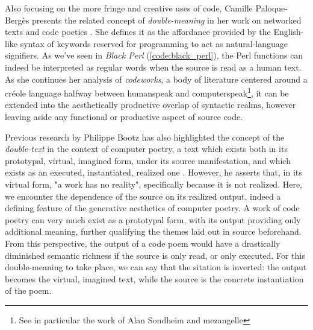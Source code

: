 Also focusing on the more fringe and creative uses of code, Camille Paloque-Bergès presents the related concept of \emph{double-meaning} in her work on networked texts and code poetics \citep{paloque-berges_poetique_2009}. She defines it as the affordance provided by the English-like syntax of keywords reserved for programming to act as natural-language signifiers. As we've seen in \emph{Black Perl} (\autoref{code:black_perl}), the Perl functions can indeed be interpreted as regular words when the source is read as a human text. As she continues her analysis of \emph{codeworks}, a body of literature centered around a créole language halfway between humanspeak and computerspeak\footnote{See in particular the work of Alan Sondheim and mezangelle}, it can be extended into the aesthetically productive overlap of syntactic realms, however leaving aside any functional or productive aspect of source code.

Previous research by Philippe Bootz has also highlighted the concept of the \emph{double-text} in the context of computer poetry, a text which exists both in its prototypal, virtual, imagined form, under its source manifestation, and which exists as an executed, instantiated, realized one \citep{bootz_problem_2005}. However, he asserts that, in its virtual form, "a work has no reality", specifically because it is not realized. Here, we encounter the dependence of the source on its realized output, indeed a defining feature of the generative aesthetics of computer poetry. A work of code poetry can very much exist as a prototypal form, with its output providing only additional meaning, further qualifying the themes laid out in source beforehand. From this perspective, the output of a code poem would have a drastically diminished semantic richness if the source is only read, or only executed. For this double-meaning to take place, we can say that the sitation is inverted: the output becomes the virtual, imagined text, while the source is the concrete instantiation of the poem.

